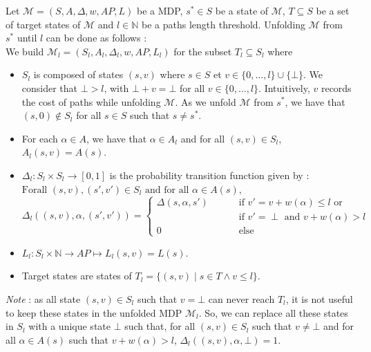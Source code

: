 \begin{definition} Let
  $\mathcal{M} = (S, A, \Delta, w, AP, L)$ be a MDP, $s^* \in S$ be a state of
  $\mathcal{M}$, $T \subseteq S$ be a set of target states of $\mathcal{M}$ and $l \in \mathbb{N}$ be a paths length threshold.
  Unfolding $\mathcal{M}$ from $s^*$ until $l$ can be done as follows : \\
  We build $\mathcal{M}_l = (S_l, A_l, \Delta_l, w, AP, L_l)$ for the subset $T_l \subseteq S_l$ where
  \begin{itemize}
  \item $S_l$ is composed of states $(s, v)$ where $s \in S$ et $v \in \{0, \dots, l\} \cup \{\bot\}$.
  We consider that $\bot > l$, with $\bot + v = \bot$ for all $v \in \{0, \dots, l\}$.
  Intuitively, $v$ records the cost of paths while unfolding $\mathcal{M}$.
  As we unfold $\mathcal{M}$ from $s^*$, we have that
  $(s, 0) \not \in S_l$ for all $s \in S$ such that $s \neq s^*$.
  \item For each $\alpha \in A$, we have that $\alpha \in A_l$ and for all $(s, v) \in S_l$, $A_l(s, v) = A(s)$.
  \item $\Delta_l : S_l \times S_l \rightarrow [0, 1]$ is the probability transition function given by :\\
  $\text{Forall } (s, v), (s', v') \in S_l \text{ and for all } \alpha \in A(s),$
  \[
  \Delta_l((s, v), \alpha, (s', v')) =
  \begin{cases}
  	\Delta(s, \alpha, s') & \quad \quad \text{ if } v' = v + w(\alpha) \leq l \text{ or}\\
  	 & \quad \quad \text{ if } v' = \perp \text{ and } v+w(\alpha) > l \\
  	0 & \quad \quad \text{ else}
  \end{cases}
  \]
  \item $L_l:S_l \times \mathbb{N} \rightarrow AP \mapsto L_l(s, v) = L(s)$.
  \item Target states are states of
  $T_l = \{(s, v) \;|\; s \in T \wedge v \leq l \}$.
  \end{itemize}
  \textit{Note} : as all state $(s, v) \in S_l$ such that $v = \bot$ can never reach $T_l$, it is not useful to keep these states in the unfolded MDP $\mathcal{M}_l$. So, we can replace all these states in $S_l$ with a unique state $\bot$ such that, for all $(s, v) \in S_l$ such that $v \neq \bot$ and for all $\alpha \in A(s)$ such that $v + w(\alpha) > l$,
  $\Delta_l((s, v), \alpha, \bot) = 1$.
\end{definition}

